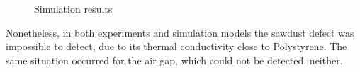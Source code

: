 \documentclass{tQRT2e}
\begin{document}
\begin{figure}
    \hspace{-20pt}
    \hspace{-5pt}
	\caption{Simulation results}
	\label{sim_res}
\end{figure}
Nonetheless, in both experiments and simulation models the sawdust defect was impossible to detect, due to its thermal conductivity close to Polystyrene. The same situation occurred for the air gap, which could not be detected, neither.  
\end{document}
